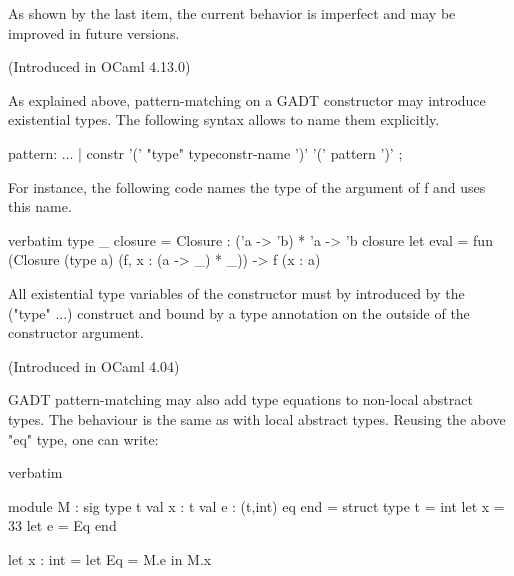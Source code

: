 
As shown by the last item, the current behavior is imperfect
and may be improved in future versions.

 (Introduced in OCaml 4.13.0)

As explained above, pattern-matching on a GADT constructor may
introduce existential types. The following syntax allows to name them
explicitly.

\begin{syntax}
pattern:
     ...
   | constr '(' "type" {{typeconstr-name}} ')' '(' pattern ')'
;
\end{syntax}

For instance, the following code names the type of the argument of f
and uses this name.

\begin{caml_example*}{verbatim}
type _ closure = Closure : ('a -> 'b) * 'a -> 'b closure
let eval = fun (Closure (type a) (f, x : (a -> _) * _)) -> f (x : a)
\end{caml_example*}
All existential type variables of the constructor must by introduced by
the ("type" ...) construct and bound by a type annotation on the
outside of the constructor argument.

 (Introduced in OCaml
4.04)

GADT pattern-matching may also add type equations to non-local
abstract types. The behaviour is the same as with local abstract
types. Reusing the above "eq" type, one can write:
\begin{camlexample}{verbatim}
\begin{caml}
\begin{camlinput}
module M : sig type t val x : t val e : (t,int) eq end = struct
  type t = int
  let x = 33
  let e = Eq
end

let x : int = let Eq = M.e in M.x
\end{camlinput}
\end{caml}
\end{camlexample}

